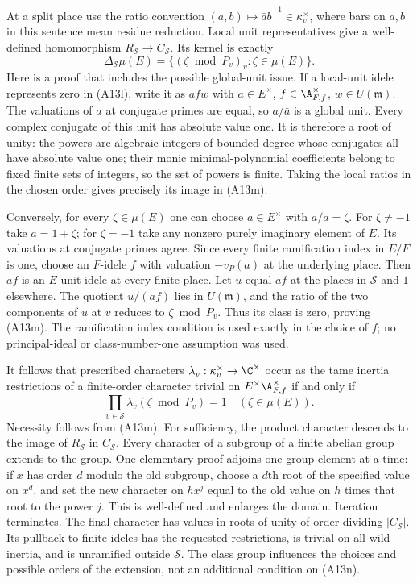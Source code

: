 \documentclass[11pt]{article}
\theoremstyle{definition}\newtheorem{definition}[theorem]{Definition}\newtheorem{remark}[theorem]{Remark}
\begin{document}
At a split place use the ratio convention
$(a,b)\mapsto\bar a\bar b^{-1}\in\kappa_v^\times$,
where bars on $a,b$ in this sentence mean residue reduction.
Local unit representatives give a well-defined homomorphism
$R_{\mathcal S}\to C_{\mathcal S}$.  Its kernel is exactly
\[
 \Delta_{\mathcal S}\mu(E)
    =\{(\zeta\bmod P_v)_v:\zeta\in\mu(E)\}.
 \tag{A13m}
\]
Here is a proof that includes the possible global-unit issue.
If a local-unit idele represents zero in (A13l), write it
as $a f w$ with $a\in E^\times$, $f\in\A_{F,f}^\times$,
$w\in U(\mathfrak m)$.  The valuations of $a$ at conjugate
primes are equal, so $a/\bar a$ is a global unit.  Every
complex conjugate of this unit has absolute value one.
It is therefore a root of unity: the powers are algebraic
integers of bounded degree whose conjugates all have
absolute value one; their monic minimal-polynomial
coefficients belong to fixed finite sets of integers,
so the set of powers is finite.  Taking the local ratios
in the chosen order gives precisely its image in (A13m).

Conversely, for every $\zeta\in\mu(E)$ one can choose
$a\in E^\times$ with $a/\bar a=\zeta$.
For $\zeta\ne-1$ take $a=1+\zeta$; for $\zeta=-1$
take any nonzero purely imaginary element of $E$.
Its valuations at conjugate primes agree.  Since every
finite ramification index in $E/F$ is one, choose an
$F$-idele $f$ with valuation $-v_P(a)$ at the underlying
place.  Then $af$ is an $E$-unit idele at every finite
place.  Let $u$ equal $af$ at the places in $\mathcal S$
and $1$ elsewhere.  The quotient $u/(af)$ lies in
$U(\mathfrak m)$, and the ratio of the two components
of $u$ at $v$ reduces to $\zeta\bmod P_v$.
Thus its class is zero, proving (A13m).  The ramification
index condition is used exactly in the choice of $f$;
no principal-ideal or class-number-one assumption was used.

It follows that prescribed characters
$\lambda_v:\kappa_v^\times\to\C^\times$ occur as the tame
inertia restrictions of a finite-order character trivial
on $E^\times\A_{F,f}^\times$ if and only if
\[
              \prod_{v\in\mathcal S}
                   \lambda_v(\zeta\bmod P_v)=1
                         \quad(\zeta\in\mu(E)).
 \tag{A13n}
\]
Necessity follows from (A13m).  For sufficiency, the
product character descends to the image of $R_{\mathcal S}$
in $C_{\mathcal S}$.  Every character of a subgroup of
a finite abelian group extends to the group.  One elementary
proof adjoins one group element at a time: if $x$ has order
$d$ modulo the old subgroup, choose a $d$th root of the
specified value on $x^d$, and set the new character on
$hx^j$ equal to the old value on $h$ times that root to
the power $j$.  This is well-defined and enlarges the
domain.  Iteration terminates.  The final character has
values in roots of unity of order dividing
$|C_{\mathcal S}|$.  Its pullback to finite ideles has
the requested restrictions, is trivial on all wild inertia,
and is unramified outside $\mathcal S$.
The class group influences the choices and possible orders
of the extension, not an additional condition on (A13n).
\end{document}
